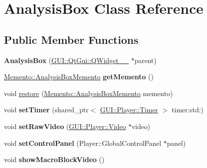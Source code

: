 \hypertarget{classGUI_1_1AnalysisBox}{}\section{Analysis\+Box Class Reference}
\label{classGUI_1_1AnalysisBox}
\subsection*{Public Member Functions}
\begin{DoxyCompactItemize}
\item 
\hypertarget{classGUI_1_1AnalysisBox_ae7931451461ed8e1f03a02e7848078c0}{}{\bfseries Analysis\+Box} (\hyperlink{classGUI_1_1QtGui_1_1QWidget____10}{G\+U\+I\+::\+Qt\+Gui\+::\+Q\+Widget\+\_\+\+\_} $\ast$parent)\label{classGUI_1_1AnalysisBox_ae7931451461ed8e1f03a02e7848078c0}

\item 
\hypertarget{classGUI_1_1AnalysisBox_a73fa952c3fb3509d83ca1dadc7cefb33}{}\hyperlink{classMemento_1_1AnalysisBoxMemento}{Memento\+::\+Analysis\+Box\+Memento} {\bfseries get\+Memento} ()\label{classGUI_1_1AnalysisBox_a73fa952c3fb3509d83ca1dadc7cefb33}

\item 
void \hyperlink{classGUI_1_1AnalysisBox_a70c1d51815b73ad12b08cbf0636e77eb}{restore} (\hyperlink{classMemento_1_1AnalysisBoxMemento}{Memento\+::\+Analysis\+Box\+Memento} memento)
\item 
\hypertarget{classGUI_1_1AnalysisBox_a0a63304dda40cabeda44acd79bb08b59}{}void {\bfseries set\+Timer} (shared\+\_\+ptr$<$ \hyperlink{classGUI_1_1Player_1_1Timer}{G\+U\+I\+::\+Player\+::\+Timer} $>$ timer\+:std\+:)\label{classGUI_1_1AnalysisBox_a0a63304dda40cabeda44acd79bb08b59}

\item 
\hypertarget{classGUI_1_1AnalysisBox_ae45e621cb87a85ffb069ac765a306711}{}void {\bfseries set\+Raw\+Video} (\hyperlink{classGUI_1_1Player_1_1Video}{G\+U\+I\+::\+Player\+::\+Video} $\ast$video)\label{classGUI_1_1AnalysisBox_ae45e621cb87a85ffb069ac765a306711}

\item 
\hypertarget{classGUI_1_1AnalysisBox_a9c1b482d1dcd6a733b84a9cdcc960263}{}void {\bfseries set\+Control\+Panel} (Player\+::\+Global\+Control\+Panel $\ast$panel)\label{classGUI_1_1AnalysisBox_a9c1b482d1dcd6a733b84a9cdcc960263}

\item 
\hypertarget{classGUI_1_1AnalysisBox_a9484911b10192b865138995df1158d7e}{}void {\bfseries show\+Macro\+Block\+Video} ()\label{classGUI_1_1AnalysisBox_a9484911b10192b865138995df1158d7e}


\end{DoxyCompactItemize}

